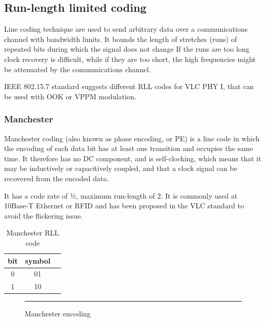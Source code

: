 \subsection{Run-length limited coding} \label{rll}

Line coding technique are used to send arbitrary data over a communications channel with bandwidth
limits.
It bounds the length of stretches (runs) of repeated bits during which the signal does not change
If the runs are too long clock recovery is difficult, while if they are too short, the high frequencies
might be attenuated by the communications channel.

IEEE 802.15.7 standard suggests different RLL codes for VLC PHY I, that can be used with OOK or VPPM modulation.
\subsubsection{Manchester}
Manchester coding (also known as phase encoding, or PE) is a line code in which the encoding of each data bit has at least one transition and occupies the same time. It therefore has no DC component, and is self-clocking, which means that it may be inductively or capacitively coupled, and that a clock signal can be recovered from the encoded data.

It has a code rate of 1⁄2, maximum run-length of 2.
It is commonly used at 10Base-T Ethernet or RFID and has been proposed in the VLC standard to avoid the flickering issue.
\begin{table}[htbp]
\begin{center}
\begin{tabular}{|c|c|r|}
  \hline
 bit & symbol \\
  \hline
  0 & 01 \\
  1 & 10 \\
  \hline
\end{tabular}
\end{center}
\caption{Manchester RLL code}
\label{tab:manchester}
\end{table}

\begin{figure}[htbp]
  \centering
    \rule{35em}{0.5pt}
  \caption[Manchester encoding]{Manchester encoding}
  \label{fig:manchester}
\end{figure}

